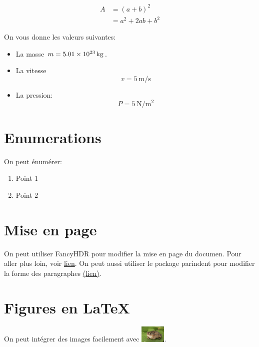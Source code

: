 \documentclass[10pt,a4paper,twoside]{article}
\begin{document}
\begin{align}
    A & = \left( a + b\right)^2 \nonumber \\
      & = a^2 + 2 ab + b^2
\end{align}

On vous donne les valeurs suivantes:
\begin{itemize}
    \item La masse $m = \qty{5.01d23}{\kilo\gram}$.
    \item La vitesse
          $$
              v = \qty[per-mode=fraction]{5}{\meter\per\second}$$
    \item La pression:
          $$
              P = \qty{5}{\newton\per\meter\squared}
          $$
\end{itemize}

\section{Enumerations}

On peut énumérer:

\begin{enumerate}
    \item Point 1
    \item Point 2
\end{enumerate}

\section{Mise en page}

On peut utiliser FancyHDR pour modifier la mise en page du documen.
Pour aller plus loin, voir \href{https://fr.overleaf.com/learn/latex/Headers_and_footers#Using_the_fancyhdr_package}{lien}.
On peut aussi utiliser le package parindent pour modifier la forme des paragraphes \href{https://www.overleaf.com/learn/latex/Articles/How_to_change_paragraph_spacing_in_LaTeX#The_parskip_package}{(lien)}.

\section{Figures en \LaTeX}

On peut intégrer des images facilement avec \includegraphics[width=12mm]{figures/toad.jpg}.
\end{document}
